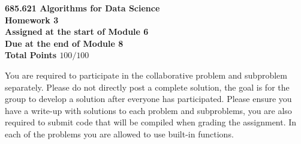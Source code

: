 \documentclass{article}
\begin{document}
\begin{center}
\bfseries 685.621 Algorithms for Data Science \\
Homework 3\\
Assigned at the start of Module 6 \\
Due at the end of Module 8 \\
Total Points $100/100$
\end{center}


You are required to participate in the collaborative problem and subproblem separately. Please do not directly post a complete solution, the goal is for the group to develop a solution after everyone has participated. Please ensure you have a write-up with solutions to each problem and subproblems, you are also required to submit code that will be compiled when grading the assignment. In each of the problems you are allowed to use built-in functions.\\
\end{document}
